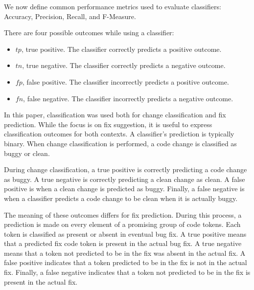 \documentclass[preprint,10pt]{sigplanconf}
\begin{document}
\par We now define common performance metrics used to evaluate classifiers:
Accuracy, Precision, Recall, and F-Measure.

There are four possible outcomes while using a classifier:
\begin{itemize}
  \item $tp$, true positive. The classifier correctly predicts a positive outcome.
  \item $tn$, true negative. The classifier correctly predicts a negative outcome.
  \item $fp$, false positive. The classifier incorrectly predicts a positive outcome.
  \item $fn$, false negative. The classifier incorrectly predicts a negative outcome.
\end{itemize}

In this paper, classification was used both for change classification and fix prediction. While the focus is on fix suggestion, 
it is useful to express classification outcomes for both contexts. A classifier's prediction is typically binary. When change classification is performed, a code change is classified as buggy or clean.

During change classification, a true positive is correctly predicting a code change as buggy. A true negative is correctly predicting a clean change as clean. 
A false positive is when a clean change is predicted as buggy. Finally, a false negative is when a classifier predicts a code change to be clean when it is actually buggy. 

The meaning of these outcomes differs for fix prediction. During this process, a prediction is made on every element of a promising group of code tokens. Each token is classified as present or absent in eventual bug fix. A true positive means that a predicted fix code token is present in the actual bug fix. A true negative means that a token not predicted to be in the fix was absent in the actual fix. 
A false positive indicates that a token predicted to be in the fix is not in the actual fix. Finally, a false negative indicates that a token not predicted to be in the fix is present in the actual fix.

%
\end{document}
